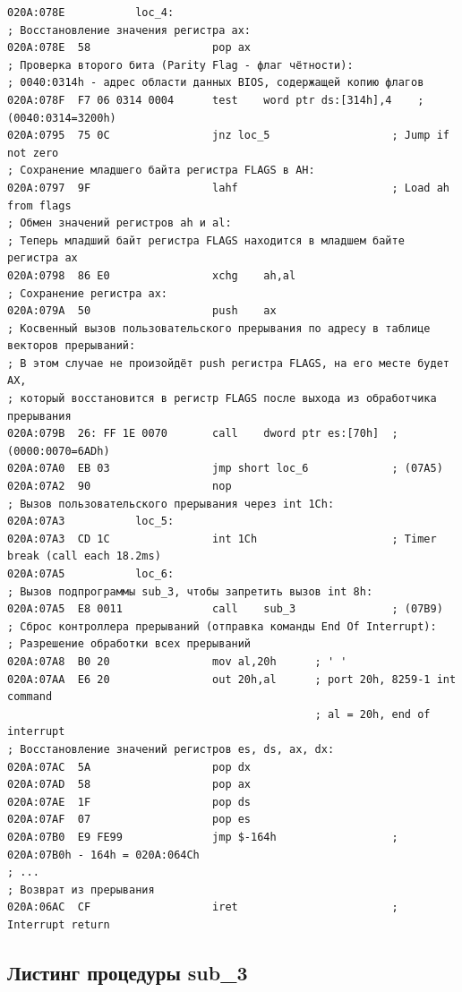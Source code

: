\documentclass[a4paper,12pt]{article}
\begin{document}
\begin{lstlisting}[style={asm}]
020A:078E			loc_4:
; Восстановление значения регистра ax:
020A:078E  58				    pop	ax
; Проверка второго бита (Parity Flag - флаг чётности):
; 0040:0314h - адрес области данных BIOS, содержащей копию флагов
020A:078F  F7 06 0314 0004	    test	word ptr ds:[314h],4	; (0040:0314=3200h)
020A:0795  75 0C			    jnz	loc_5			        ; Jump if not zero
; Сохранение младшего байта регистра FLAGS в AH:
020A:0797  9F				    lahf				        ; Load ah from flags
; Обмен значений регистров ah и al: 
; Теперь младший байт регистра FLAGS находится в младшем байте регистра ax
020A:0798  86 E0			    xchg	ah,al
; Сохранение регистра ax:
020A:079A  50				    push	ax
; Косвенный вызов пользовательского прерывания по адресу в таблице векторов прерываний:
; В этом случае не произойдёт push регистра FLAGS, на его месте будет AX, 
; который восстановится в регистр FLAGS после выхода из обработчика прерывания
020A:079B  26: FF 1E 0070	    call	dword ptr es:[70h]	; (0000:0070=6ADh)
020A:07A0  EB 03			    jmp	short loc_6		        ; (07A5)
020A:07A2  90				    nop
; Вызов пользовательского прерывания через int 1Ch:
020A:07A3			loc_5:
020A:07A3  CD 1C			    int	1Ch			            ; Timer break (call each 18.2ms)
020A:07A5			loc_6:
; Вызов подпрограммы sub_3, чтобы запретить вызов int 8h:
020A:07A5  E8 0011			    call	sub_3			    ; (07B9)
; Сброс контроллера прерываний (отправка команды End Of Interrupt):
; Разрешение обработки всех прерываний
020A:07A8  B0 20			    mov	al,20h		; ' '
020A:07AA  E6 20			    out	20h,al		; port 20h, 8259-1 int command
                                                ; al = 20h, end of interrupt
; Восстановление значений регистров es, ds, ax, dx:
020A:07AC  5A				    pop	dx
020A:07AD  58				    pop	ax
020A:07AE  1F				    pop	ds
020A:07AF  07				    pop	es
020A:07B0  E9 FE99			    jmp	$-164h 				    ; 020A:07B0h - 164h = 020A:064Ch
; ...
; Возврат из прерывания
020A:06AC  CF					iret						; Interrupt return
\end{lstlisting}

\subsection{Листинг процедуры sub\_3}
\end{document}
